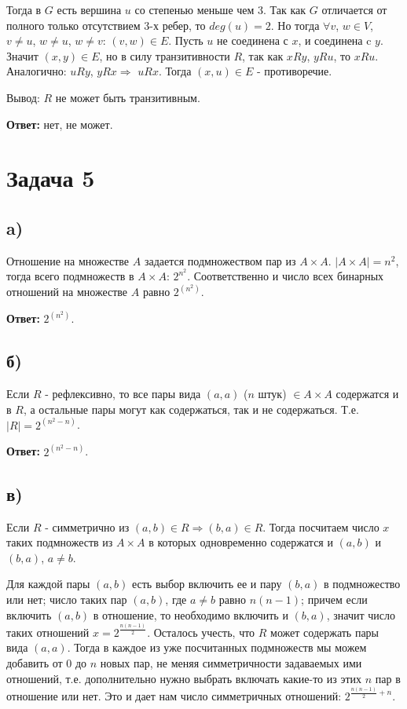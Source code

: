 \documentclass{article}
\begin{document}
	Тогда в $G$ есть вершина $u$ со степенью меньше чем 3. Так как $G$ отличается от полного только отсутствием 3-х ребер, то $deg(u) = 2$. Но тогда $\forall v$, $w \in V$, $v \ne u$, $w \ne u$, $w \ne v$: $(v, w) \in E$. Пусть $u$ не соединена с $x$, и соединена c $y$. Значит $(x, y) \in E$, но в силу транзитивности $R$, так как $x R y$, $y R u$, то $x R u$. Аналогично: $u R y$, $y R x \Rightarrow$ $u R x$. Тогда $(x, u) \in E$ - противоречие.
	
	Вывод: $R$ не может быть транзитивным.
	
	\textbf{Ответ:} нет, не может.
	
	\section {Задача 5} 
	
	\subsection {a)}
	 Отношение на множестве $A$ задается подмножеством пар из $ A \times A$. $|A \times A| = n^2 $, тогда всего подмножеств в $A \times A$: $2^{n^2}$. Соответственно и число всех бинарных отношений на множестве $A$ равно $2^{(n^2)}$.
	 
	 \textbf{Ответ:} $2^{(n^2)}$. 
	 
	 \subsection {б)}
	 Если $R$ - рефлексивно, то все пары вида $(a, a) $ ($n$ штук) $ \in A \times A$ содержатся и в $R$, а остальные пары могут как содержаться, так и не содержаться. Т.е. $|R| = 2^{(n^2 - n)}$.
	 
	 \textbf{Ответ:} $2^{(n^2 - n)}$.
	  
	\subsection {в)}
	Если $R$ - симметрично из $(a, b) \in R \Rightarrow (b, a) \in R$. Тогда посчитаем число $x$ таких подмножеств из $A \times A$ в которых одновременно содержатся и $(a, b)$ и $(b, a)$, $a \ne b$. 
	
	Для каждой пары $(a, b)$ есть выбор включить ее и пару $(b, a)$ в подмножество или нет; число таких пар $(a, b)$, где $a \ne b$ равно $n(n - 1)$; причем если включить $(a, b)$ в отношение, то необходимо включить и $(b, a)$, значит число таких отношений $x = 2^{\frac{n(n - 1)} {2}}$. Осталось учесть, что $R$ может содержать пары вида $(a, a)$. Тогда в каждое из уже посчитанных подмножеств мы можем добавить от $0$ до $n$ новых пар, не меняя симметричности задаваемых ими отношений, т.е. дополнительно нужно выбрать включать какие-то из этих $n$ пар в отношение или нет. Это и дает нам число симметричных отношений: $2^{\frac{n(n - 1)} {2} + n}$.
		
\end{document}
